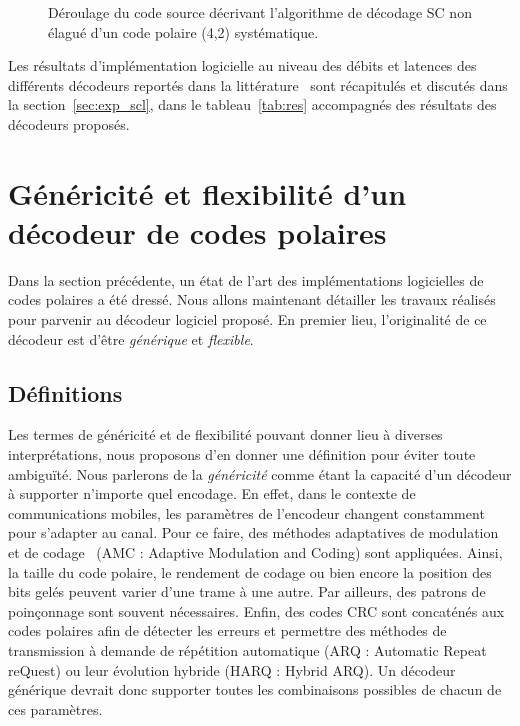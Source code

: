 \begin{figure}[t]
{\begin{minipage}{.35\linewidth}
  \label{fig:unrolled_tree}
  \end{minipage}%
  }
  \caption{Déroulage du code source décrivant l'algorithme de décodage SC non élagué d'un code polaire (4,2) systématique.}
  \label{fig:unrolling}
\end{figure}

Les résultats d'implémentation logicielle au niveau des débits et latences des différents décodeurs reportés dans la littérature~\cite{sarkis_increasing_2014,sarkis_fast_2016,shen_low-latency_2016} sont récapitulés et discutés dans la section~\ref{sec:exp_scl}, dans le tableau~\ref{tab:res} accompagnés des résultats des décodeurs proposés.

\section{Généricité et flexibilité d'un décodeur de codes polaires}
\label{sec:gen_scl}

Dans la section précédente, un état de l'art des implémentations logicielles de codes polaires a été dressé. Nous allons maintenant détailler les travaux réalisés pour parvenir au décodeur logiciel proposé. En premier lieu, l'originalité de ce décodeur est d'être \textit{générique} et \textit{flexible}.

\subsection{Définitions}
Les termes de généricité et de flexibilité pouvant donner lieu à diverses interprétations, nous proposons d'en donner une définition pour éviter toute ambiguïté.
Nous parlerons de la \textit{généricité} comme étant la capacité d'un décodeur à supporter n'importe quel encodage.
En effet, dans le contexte de communications mobiles, les paramètres de l'encodeur changent constamment pour s'adapter au canal. Pour ce faire, des méthodes adaptatives de modulation et de codage~\cite{dahlman_4g:_2013} (AMC : Adaptive Modulation and Coding) sont appliquées. Ainsi, la taille du code polaire, le rendement de codage ou bien encore la position des bits gelés peuvent varier d'une trame à une autre. Par ailleurs, des patrons de poinçonnage sont souvent nécessaires. Enfin, des codes CRC sont concaténés aux codes polaires afin de détecter les erreurs et permettre des méthodes de transmission à demande de répétition automatique (ARQ : Automatic Repeat reQuest) ou leur évolution hybride (HARQ : Hybrid ARQ). Un décodeur générique devrait donc supporter toutes les combinaisons possibles de chacun de ces paramètres.

